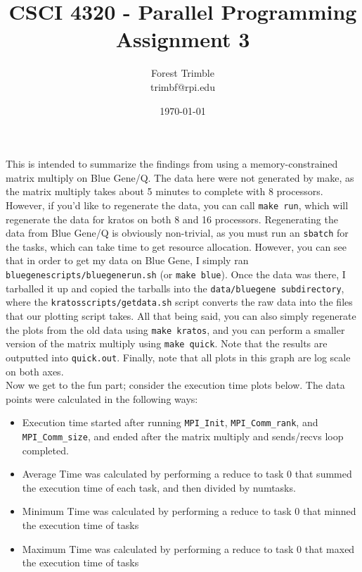 \documentclass[twocolumn]{article}
\title{CSCI 4320 - Parallel Programming\\Assignment 3}
\author{Forest Trimble\\trimbf@rpi.edu}
\date{\today}
\begin{document}
\maketitle

\pagestyle{fancy}
\fancyhead{}
\fancyhead[R]{\today}

This is intended to summarize the findings from using a memory-constrained matrix
multiply on Blue Gene/Q.  The data here were not generated by make, as the matrix 
multiply takes about 5 minutes to complete with 8 processors. However, if you'd 
like to regenerate the data, you can call \texttt{make run}, which will regenerate
the data for kratos on both 8 and 16 processors. Regenerating the 
data from Blue Gene/Q is obviously non-trivial, as you must run an \texttt{sbatch}
for the tasks, which can take time to get resource allocation. However, you can see
that in order to get my data on Blue Gene, I simply ran 
\texttt{bluegenescripts/bluegenerun.sh} (or \texttt{make blue}). Once the data was 
there, I tarballed it up and copied the tarballs into the \texttt{data/bluegene 
subdirectory}, where the \texttt{kratosscripts/getdata.sh} script converts the raw
data into the files that our plotting script takes. All that being said, you can 
also simply regenerate the plots from the old data using \texttt{make kratos}, and
you can perform a smaller version of the matrix multiply using \texttt{make quick}.
Note that the results are outputted into \texttt{quick.out}. Finally, note that
all plots in this graph are log scale on both axes. \\

Now we get to the fun part; consider the execution time plots below. The data 
points were calculated in the following ways:
\begin{itemize}
\item Execution time started after running \texttt{MPI\_Init}, 
  \texttt{MPI\_Comm\_rank}, and \texttt{MPI\_Comm\_size}, and ended after the 
  matrix multiply and sends/recvs loop completed.
\item Average Time was calculated by performing a reduce to task 0 that summed
  the execution time of each task, and then divided by numtasks. 
\item Minimum Time was calculated by performing a reduce to task 0 that minned
  the execution time of tasks
\item Maximum Time was calculated by performing a reduce to task 0 that maxed
  the execution time of tasks
\end{itemize}
\end{document}
